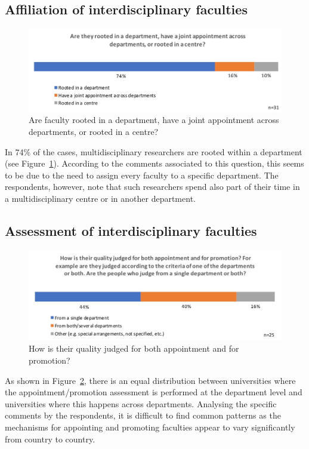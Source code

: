 \subsection{Affiliation of interdisciplinary faculties}
\begin{figure}[h]
\centering
\includegraphics[width = \linewidth]{charts/3b.jpg}
\caption{Are faculty rooted in a department, have a joint appointment across departments, or rooted in a centre?}
\label{sect3:affiliation}
\end{figure}

In 74\% of the cases, multidisciplinary researchers are rooted within
a department (see Figure~\ref{sect3:affiliation}). 
According to the comments associated to this question,
this seems to be due to the need to assign every faculty to a specific
department. The respondents, however, note that such researchers spend
also part of their time in a multidisciplinary centre or in another
department. 

\subsection{Assessment of interdisciplinary faculties}


\begin{figure}[h]
\centering
\includegraphics[width = \linewidth]{charts/3c.jpg}
\caption{How is their quality judged for both appointment and for promotion?}
\label{sect3:assessment}
\end{figure}

As shown in Figure~\ref{sect3:assessment}, there is an equal distribution between universities
where the appointment/promotion assessment is performed at the
department level and universities where this happens across
departments. Analysing the specific comments by the respondents, it is
difficult to find common patterns as the mechanisms for appointing and
promoting faculties appear to vary significantly from country to
country. 

